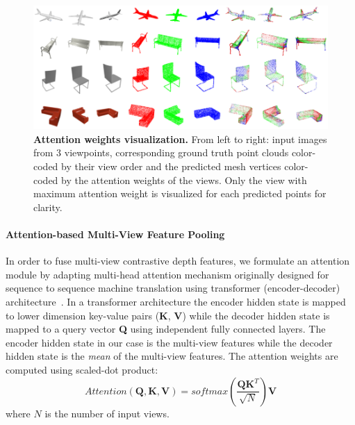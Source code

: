 \begin{figure}[t]
\begin{center}
\includegraphics[width=\linewidth]{imgs/attention_weights_visualization.png}
\end{center}
    \caption{
        \textbf{Attention weights visualization.}
        From left to right: input images from 3 viewpoints, corresponding ground truth point clouds color-coded by their view order and the predicted mesh vertices color-coded by the attention weights of the views.
        Only the view with maximum attention weight is visualized for each predicted points for clarity.
    }
\label{fig:attention_weights}
\end{figure}

\paragraph{Attention-based Multi-View Feature Pooling}
In order to fuse multi-view contrastive depth features, we formulate an attention module by adapting multi-head attention mechanism originally designed for sequence to sequence machine translation using transformer (encoder-decoder) architecture~\cite{vaswani2017attention}.
In a transformer architecture the encoder hidden state is mapped to lower dimension key-value pairs (\textbf{K}, \textbf{V})
while the decoder hidden state is mapped to a query vector \textbf{Q} using independent fully connected layers.
The encoder hidden state in our case is the multi-view features while the decoder hidden state is the \emph{mean} of the multi-view features.
The attention weights are computed using scaled-dot product:
\begin{equation}
    Attention(\mathbf{Q}, \mathbf{K}, \mathbf{V}) = softmax(\frac{\mathbf{Q} \mathbf{K}^{T}}{\sqrt{N}}) \mathbf{V}
    \label{equ:attention}
\end{equation}
\noindent where $N$ is the number of input views.


